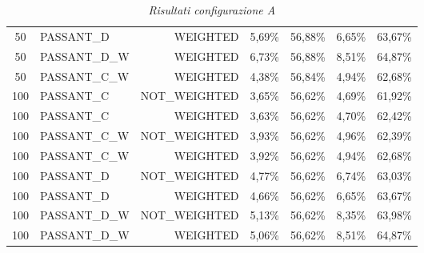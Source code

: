 \begin{table}[H]
{\begin{tabular}{ c l r c c c c }
	50 &  PASSANT\_D &   WEIGHTED &     5,69\% &    56,88\% &     6,65\% &    63,67\% \\
	
	50 & PASSANT\_D\_W &   WEIGHTED &     6,73\% &    56,88\% &     8,51\% &    64,87\% \\
	
	50 & PASSANT\_C\_W &   WEIGHTED &     4,38\% &    56,84\% &     4,94\% &    62,68\% \\
	
	100 &  PASSANT\_C & NOT\_WEIGHTED &     3,65\% &    56,62\% &     4,69\% &    61,92\% \\
	
	100 &  PASSANT\_C &   WEIGHTED &     3,63\% &    56,62\% &     4,70\% &    62,42\% \\
	
	100 & PASSANT\_C\_W & NOT\_WEIGHTED &     3,93\% &    56,62\% &     4,96\% &    62,39\% \\
	
	100 & PASSANT\_C\_W &   WEIGHTED &     3,92\% &    56,62\% &     4,94\% &    62,68\% \\
	
	100 &  PASSANT\_D & NOT\_WEIGHTED &     4,77\% &    56,62\% &     6,74\% &    63,03\% \\
	
	100 &  PASSANT\_D &   WEIGHTED &     4,66\% &    56,62\% &     6,65\% &    63,67\% \\
	
	100 & PASSANT\_D\_W & NOT\_WEIGHTED &     5,13\% &    56,62\% &     8,35\% &    63,98\% \\
	
	100 & PASSANT\_D\_W &   WEIGHTED &     5,06\% &    56,62\% &     8,51\% &    64,87\% \\
	\bottomrule
\end{tabular}  
}
	\caption{\emph{Risultati configurazione A}}
\end{table}


